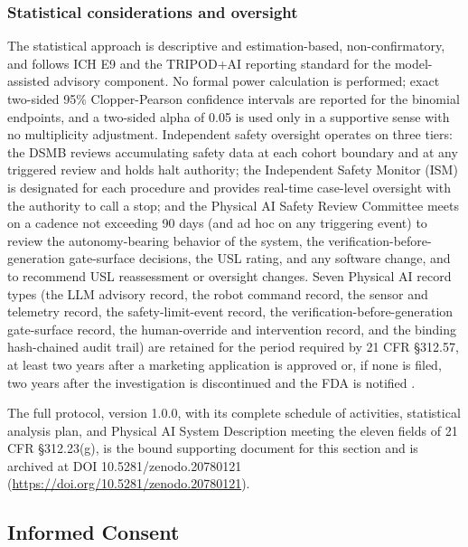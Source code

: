 \subsubsection*{Statistical considerations and oversight}

The statistical approach is descriptive and estimation-based, non-confirmatory, and
follows ICH E9 and the TRIPOD+AI reporting standard for the model-assisted advisory
component. No formal power calculation is performed; exact two-sided 95\%
Clopper-Pearson confidence intervals are reported for the binomial endpoints, and a
two-sided alpha of 0.05 is used only in a supportive sense with no multiplicity
adjustment. Independent safety oversight operates on three tiers: the DSMB reviews
accumulating safety data at each cohort boundary and at any triggered review and
holds halt authority; the Independent Safety Monitor (ISM) is designated for each
procedure and provides real-time case-level oversight with the authority to call a
stop; and the Physical AI Safety Review Committee meets on a cadence not exceeding
90 days (and ad hoc on any triggering event) to review the autonomy-bearing behavior
of the system, the verification-before-generation gate-surface decisions, the USL
rating, and any software change, and to recommend USL reassessment or oversight
changes. Seven Physical AI record types (the LLM advisory record, the robot command
record, the sensor and telemetry record, the safety-limit-event record, the
verification-before-generation gate-surface record, the human-override and
intervention record, and the binding hash-chained audit trail) are retained for the
period required by 21 CFR \S 312.57, at least two years after a marketing
application is approved or, if none is filed, two years after the investigation is
discontinued and the FDA is notified \cite{daraxwhipple,clintrustpai}.

The full protocol, version 1.0.0, with its complete schedule of activities,
statistical analysis plan, and Physical AI System Description meeting the eleven
fields of 21 CFR \S 312.23(g), is the bound supporting document for this section and
is archived at DOI 10.5281/zenodo.20780121
(\href{https://doi.org/10.5281/zenodo.20780121}{https://doi.org/10.5281/zenodo.20780121}).

\subsection{Informed Consent}

